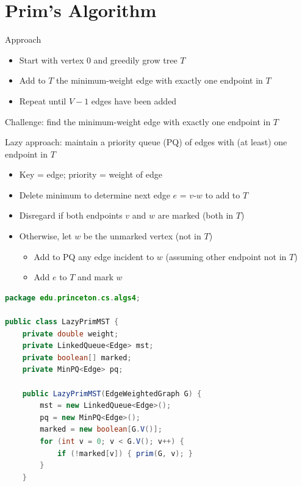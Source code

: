 \documentclass[8pt,a4paper,compress]{beamer}
\begin{document}
\section{Prim's Algorithm}
\begin{frame}[fragile]
Approach
\begin{itemize}
\item Start with vertex 0 and greedily grow tree $T$

\item Add to $T$ the minimum-weight edge with exactly one endpoint in $T$

\item Repeat until $V - 1$ edges have been added
\end{itemize}

\bigskip

Challenge: find the minimum-weight edge with exactly one endpoint in $T$
\end{frame}

\begin{frame}[fragile]
Lazy approach: maintain a priority queue (PQ) of edges with (at least) one endpoint in $T$
\begin{itemize}
\item Key = edge; priority = weight of edge

\item Delete minimum to determine next edge $e$ = $v$-$w$ to add to $T$

\item Disregard if both endpoints $v$ and $w$ are marked (both in $T$)

\item Otherwise, let $w$ be the unmarked vertex (not in $T$)
\begin{itemize}
\item Add to PQ any edge incident to $w$ (assuming other endpoint not in $T$)
\item Add $e$ to $T$ and mark $w$
\end{itemize}
\end{itemize}

\begin{lstlisting}[language=Java]
package edu.princeton.cs.algs4;

public class LazyPrimMST {
    private double weight; 
    private LinkedQueue<Edge> mst; 
    private boolean[] marked; 
    private MinPQ<Edge> pq; 

    public LazyPrimMST(EdgeWeightedGraph G) {
        mst = new LinkedQueue<Edge>();
        pq = new MinPQ<Edge>();
        marked = new boolean[G.V()];
        for (int v = 0; v < G.V(); v++) {
            if (!marked[v]) { prim(G, v); }  
        }  
    }
\end{lstlisting}
\end{frame}
\end{document}
